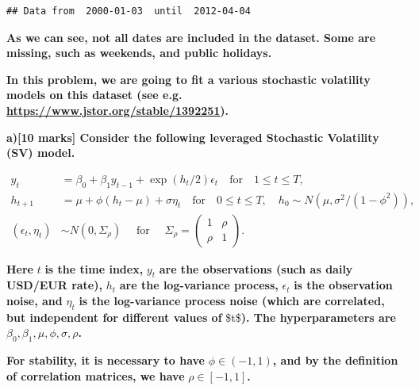 \documentclass[
]{article}
\newenvironment{Shaded}{\begin{snugshade}}{\end{snugshade}}
\newcommand{\FunctionTok}[1]{\textcolor[rgb]{0.00,0.00,0.00}{#1}}
\newcommand{\NormalTok}[1]{#1}
\newcommand{\SpecialCharTok}[1]{\textcolor[rgb]{0.00,0.00,0.00}{#1}}
\newcommand{\StringTok}[1]{\textcolor[rgb]{0.31,0.60,0.02}{#1}}
\begin{document}
\begin{Shaded}
\end{Shaded}

\begin{verbatim}
## Data from  2000-01-03  until  2012-04-04
\end{verbatim}

\textbf{As we can see, not all dates are included in the dataset. Some
are missing, such as weekends, and public holidays.}

\textbf{In this problem, we are going to fit a various stochastic
volatility models on this dataset (see e.g.
\url{https://www.jstor.org/stable/1392251}).}

\textbf{a){[}10 marks{]} Consider the following leveraged Stochastic
Volatility (SV) model.}

\(\begin{aligned} y_t&=\beta_0+\beta_1 y_{t-1}+\exp(h_t/2)\epsilon_t \quad \text{for}\quad 1\le t\le T,\\ h_{t+1}&=\mu+\phi(h_t-\mu)+\sigma \eta_t\quad \text{for} \quad 0\le t\le T, \quad h_0\sim N(\mu, \sigma^2/(1-\phi^2)),\\(\epsilon_t,\eta_t)&\sim N\left(0, \Sigma_{\rho}\right)\quad \text{ for } \quad \Sigma_{\rho}=\left(\begin{matrix}1 & \rho\\ \rho & 1\end{matrix}\right). \end{aligned}\)

\textbf{Here} \(t\) \textbf{is the time index,} \(y_t\) \textbf{are the
observations (such as daily USD/EUR rate),} \(h_t\) \textbf{are the
log-variance process,} \(\epsilon_t\) \textbf{is the observation noise,
and} \(\eta_t\) \textbf{is the log-variance process noise (which are
correlated, but independent for different values of} \$t\$\textbf{). The
hyperparameters are}
\(\beta_0, \beta_1, \mu, \phi, \sigma, \rho\)\textbf{.}

\textbf{For stability, it is necessary to have}
\(\phi\in (-1,1)\)\textbf{, and by the definition of correlation
matrices, we have} \(\rho\in [-1,1]\)\textbf{.}
\end{document}
